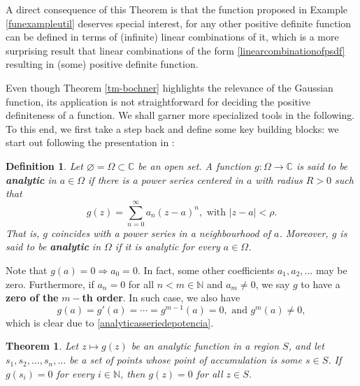 \documentclass[12pt]{report} %
\newtheorem{definition}{Definition}
\newtheorem{theorem}{Theorem}
\newcommand{\tmstrong}[1]{\textbf{#1}}
\begin{document}
A direct consequence of this Theorem is that the function proposed in Example
\ref{funexampleutil} deserves special interest, for any other positive
definite function can be defined in terms of (infinite) linear combinations of
it, which is a more surprising result that linear combinations of the form
\eqref{linearcombinationofpsdf} resulting in (some) positive definite
function. 

Even though Theorem \ref{tm-bochner} highlights the relevance
of the Gaussian function, its application is not straightforward 
for deciding the positive definiteness of a function.
We shall garner more specialized tools in the following. 
To this end, we first take a step back and define some key building blocks: we
start out following the presentation in {\cite{titchmarsh1939theory}}:

\begin{definition}
  Let $\varnothing = \Omega \subset \mathbb{C}$ be an open set. A function $g
  : \Omega \rightarrow \mathbb{C}$ is said to be {\tmstrong{analytic}} in $a
  \in \Omega$ if there is a power series centered in $a$ with radius $R > 0$
  such that
  \begin{equation}
    g (z) = \sum_{n = 0}^{\infty} a_n (z - a)^n
    \label{analyticasseriedepotencia}, \text{ with } | z - a | < \rho .
  \end{equation}
  That is, $g$ coincides with a power series in a neighbourhood of $a$.
  Moreover, $g$ is said to be {\tmstrong{analytic}} in $\Omega$ if it is
  analytic for every $a \in \Omega$.
\end{definition}

Note that $g (a) = 0 \Rightarrow a_0 = 0$. In fact, some other coefficients
$a_1, a_2, \ldots$ may be zero. Furthermore, if $a_n = 0$ for all $n < m \in
\mathbb{N}$ and $a_m \neq 0$, we say $g$ to have a {\tmstrong{zero of the }}$m
-${\tmstrong{th order}}. In such case, we also have
\[ g (a) = g' (a) = \cdots = g^{m - 1} (a) = 0, \text{ and } g^m (a) \neq 0,
\]
which is clear due to \eqref{analyticasseriedepotencia}.

\begin{theorem}
  \label{theorem-titschmarch}Let $z \mapsto g (z)$ be an analytic function in
  a region $S$, and let $s_1, s_2, \ldots, s_n, \ldots$ be a set of points
  whose point of accumulation is some $s \in S$. If $g (s_i) = 0$ for every $i
  \in \mathbb{N}$, then $g (z) = 0$ for all $z \in S$.
\end{theorem}
\end{document}
